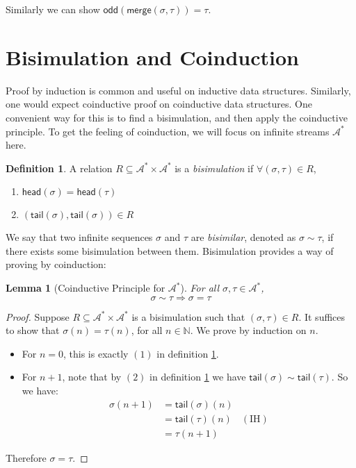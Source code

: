 \documentclass{article}
\newcommand{\alphA}{\mathcal{A}}
\newcommand{\natN}{\mathbb{N}}
\newcommand{\odd}{\mathsf{odd}}
\newcommand{\merge}{\mathsf{merge}}
\newcommand{\head}{\mathsf{head}}
\newcommand{\tail}{\mathsf{tail}}
\newcommand{\bis}{\sim}
\newcommand{\imply}{\Rightarrow}
\newtheorem{lemma}[theorem]{Lemma}
\theoremstyle{definition}
\newtheorem{definition}[theorem]{Definition}
\theoremstyle{definition}
\begin{document}
Similarly we can show    $\odd(\merge(\sigma, \tau)) = \tau$.
    
\section{Bisimulation and Coinduction}
Proof by induction is common and useful on inductive data structures. Similarly, one would expect coinductive proof on coinductive data structures. One convenient way for this is to find a bisimulation, and then apply the coinductive principle. To get the feeling of coinduction, we will focus on infinite streams $\alphA^*$ here.
\begin{definition}\label{def:bis-stream}
A relation $R \subseteq \alphA^* \times \alphA^*$ is a \emph{bisimulation} if $\forall (\sigma, \tau) \in R$, 
\begin{enumerate}
    \item $\head(\sigma) = \head(\tau)$
    \item $(\tail(\sigma), \tail(\sigma)) \in R$
\end{enumerate}
\end{definition}

We say that two infinite sequences $\sigma$ and $\tau$ are \emph{bisimilar}, denoted as $\sigma\bis \tau$, if there exists some bisimulation between them. Bisimulation provides a way of proving by coinduction:
\begin{lemma}[Coinductive Principle for $\alphA^*$]
For all $\sigma, \tau\in \alphA^*$,
\begin{equation*}
    \sigma\bis \tau \imply \sigma = \tau
\end{equation*}
\end{lemma}
\begin{proof}
Suppose $R\subseteq \alphA^* \times \alphA^*$ is a bisimulation such that $(\sigma, \tau) \in R$. It suffices to show that $\sigma(n) = \tau(n)$, for all $n\in \natN$. We prove by induction on $n$.
\begin{itemize}
    \item For $n=0$, this is exactly $(1)$ in definition \ref{def:bis-stream}.
    \item For $n + 1$, note that by $(2)$ in definition \ref{def:bis-stream} we have $\tail(\sigma) \bis \tail(\tau)$. So we have:
    \begin{align*}
        \sigma(n+1) & = \tail(\sigma)(n) \\
        & = \tail(\tau)(n) & (\text{IH}) \\
        & = \tau(n+1)
    \end{align*}
\end{itemize}
Therefore $\sigma = \tau$.
\end{proof}
\end{document}
